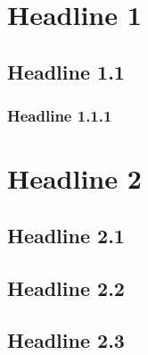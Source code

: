 \chapter{Headline 1}
\section{Headline 1.1}
\subsection{Headline 1.1.1}
\chapter{Headline 2}
\section{Headline 2.1}
\section{Headline 2.2}
\section{Headline 2.3}